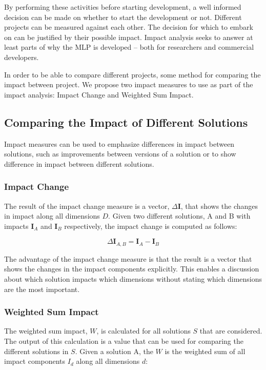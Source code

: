 \documentclass{article}
\begin{document}
By performing these activities before starting development, a well informed decision can be made on whether to start the development or not.
Different projects can be measured against each other. 
The decision for which to embark on can be justified by their possible impact.
Impact analysis seeks to answer at least parts of why the MLP is developed -- both for researchers and commercial developers.

In order to be able to compare different projects, some method for comparing the impact between project.
We propose two impact measures to use as part of the impact analysis: Impact Change and Weighted Sum Impact.

\subsection{Comparing the Impact of Different Solutions}%
Impact measures can be used to emphasize differences in impact between solutions, such as improvements between versions of a solution or to show difference in impact between different solutions.

\subsubsection{Impact Change} 
The result of the impact change measure is a vector, $\Delta \textbf{I}$, that shows the changes in impact along all dimensions $D$.  
Given two different solutions, A and B with impacts $\textbf{I}_A$  and $\textbf{I}_B$ respectively, the impact change is computed as follows:

\begin{equation}
\Delta \textbf{I}_{A,B} = \textbf{I}_A - \textbf{I}_B
\end{equation} 

The advantage of the impact change measure is that the result is a vector that shows the changes in the impact components explicitly.
This enables a discussion about which solution impacts which dimensions without stating which dimensions are the most important.

\subsubsection{Weighted Sum Impact}
The weighted sum impact, $W$, is calculated for all solutions $S$ that are considered.
The output of this calculation is a value that can be used for comparing the different solutions in $S$.
Given a solution A, the $W$ is the weighted sum of all impact components $I_d$ along all dimensions $d$: %
\end{document}
